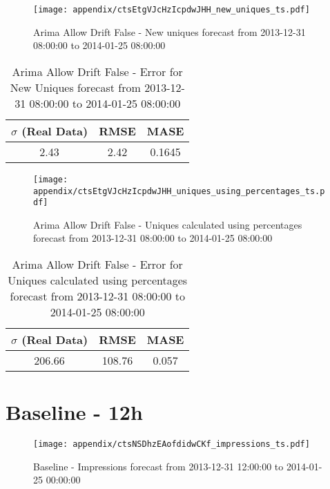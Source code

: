 \begin{figure}[H] \begin{center} \leavevmode
\texttt{[image: appendix/ctsEtgVJcHzIcpdwJHH\_new\_uniques\_ts.pdf]} \caption{
Arima Allow Drift False - New uniques forecast from 2013-12-31 08:00:00 to 2014-01-25 08:00:00} \label{fig:appendix/ctsEtgVJcHzIcpdwJHH_new_uniques_ts.pdf} \end{center}
\end{figure}

\begin{table}[H]
\centering
\footnotesize
\begin{tabular}{ccc}
$\sigma$ (Real Data) & RMSE & MASE   \\ \hline
2.43 & 2.42 & 0.1645 \\
\end{tabular}

\vspace{0.5cm}

\caption{
Arima Allow Drift False - Error for New Uniques forecast from 2013-12-31 08:00:00 to 2014-01-25 08:00:00}
\end{table}

\begin{figure}[H] \begin{center} \leavevmode
\texttt{[image: appendix/ctsEtgVJcHzIcpdwJHH\_uniques\_using\_percentages\_ts.pdf]} \caption{
Arima Allow Drift False - Uniques calculated using percentages forecast from 2013-12-31 08:00:00 to 2014-01-25 08:00:00} \label{fig:appendix/ctsEtgVJcHzIcpdwJHH_uniques_using_percentages_ts.pdf} \end{center}
\end{figure}

\begin{table}[H]
\centering
\footnotesize
\begin{tabular}{ccc}
$\sigma$ (Real Data) & RMSE & MASE   \\ \hline
206.66 & 108.76 & 0.057 \\
\end{tabular}

\vspace{0.5cm}

\caption{
Arima Allow Drift False - Error for Uniques calculated using percentages forecast from 2013-12-31 08:00:00 to 2014-01-25 08:00:00}
\end{table}

\section{Baseline - 12h}
\begin{figure}[H] \begin{center} \leavevmode
\texttt{[image: appendix/ctsNSDhzEAofdidwCKf\_impressions\_ts.pdf]} \caption{
Baseline - Impressions forecast from 2013-12-31 12:00:00 to 2014-01-25 00:00:00} \label{fig:appendix/ctsNSDhzEAofdidwCKf_impressions_ts.pdf} \end{center}
\end{figure}

